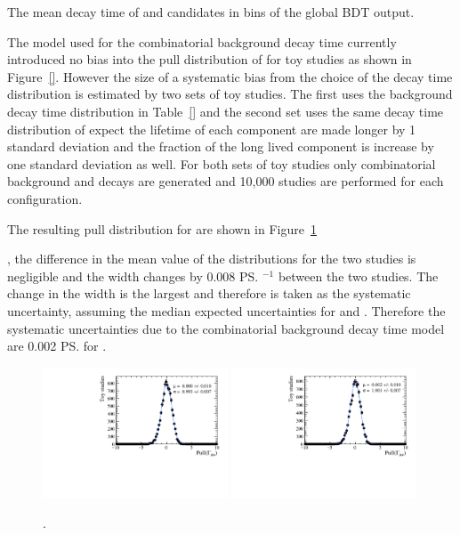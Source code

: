 {\begin{table}[htbp]
\begin{center}
\caption{The mean decay time of \bsmumu and \bhh candidates in bins of the global BDT output.}
\label{tab:MeanDecayTimeBDTBins}
\end{center}
\end{table}
The model used for the combinatorial background decay time currently introduced no bias into the pull distribution of \Gmumu for toy studies as shown in Figure~\ref{}. However the size of a systematic bias from the choice of the decay time distribution is estimated by two sets of toy studies. The first uses the background decay time distribution in Table~\ref{} and the second set uses the same decay time distribution of expect the lifetime of each component are made longer by 1 standard deviation and the fraction of the long lived component is increase by one standard deviation as well. For both sets of toy studies only combinatorial background and \bsmumu decays are generated and 10,000 studies are performed for each configuration. 

The resulting pull distribution for \Gmumu are shown in Figure~\ref{fig:CBGextreme}}, the difference in the mean value of the distributions for the two studies is negligible and the width changes by 0.008 \ps$^{-1}$ between the two studies. The change in the width is the largest and therefore is taken as the systematic uncertainty, assuming the median expected uncertainties for \Gmumu and \tmumu. Therefore the systematic uncertainties due to the combinatorial background decay time model are 0.002 \ps for \tmumu. %

\begin{figure}[htbp]
  \centering
    \includegraphics[width=0.49\textwidth]{./Figs/LifetimeSystematics/Gamma_pull_mass_pdf_Run1.pdf}
    \includegraphics[width=0.49\textwidth]{./Figs/LifetimeSystematics/Bs2MuMu_gamma_pull_CKM_extremeCBG_DT.pdf}

  \caption{.}
  \label{fig:CBGextreme}
\end{figure}



